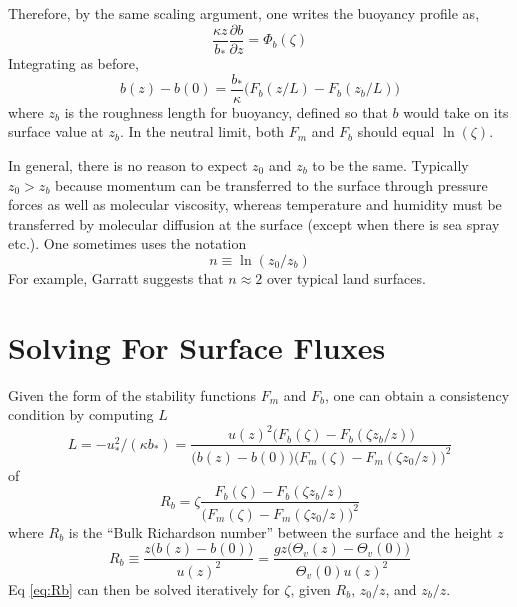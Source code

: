 \documentclass[12pt, letterpaper]{article}
\begin{document}
Therefore, by the same scaling argument, one writes the buoyancy profile as,
\begin{equation}
  \frac{\kappa z}{b_*} \frac{\partial b}{\partial z} = \Phi_b(\zeta) \label{eq:bprofile}
\end{equation}
Integrating as before,
\begin{equation}
  b(z) - b(0) = \frac{b_*}{\kappa}\big(F_b\left(z/L\right) - F_b\left(z_b/L\right)\big)
\end{equation}
where $z_b$ is the roughness length for buoyancy, defined so that $b$
would take on its surface value at $z_b$.  In the neutral limit, both
$F_m$ and $F_b$ should equal $\ln\left(\zeta\right)$.

In general, there is no reason to expect $z_0$ and $z_b$ to be the
same.  Typically $z_0 > z_b$ because momentum can be transferred to
the surface through pressure forces as well as molecular viscosity,
whereas temperature and humidity must be transferred by molecular
diffusion at the surface (except when there is sea spray etc.).  One
sometimes uses the notation
\begin{equation}
  n \equiv \ln\left(z_0/z_b\right)
\end{equation}
For example, Garratt suggests that $n \approx 2$ over typical land
surfaces.

\section{Solving For Surface Fluxes}

Given the form of the stability functions $F_m$ and $F_b$, one can
obtain a consistency condition by computing $L$
\begin{equation}
  L = -u_*^2/(\kappa b_*) = \frac{u(z)^2\big(F_b\left(\zeta\right) - F_b\left(\zeta z_b/z\right)\big)}
    {\big(b(z) - b(0)\big)\big(F_m\left(\zeta\right) - F_m\left(\zeta z_0/z\right)\big)^2}
\end{equation}
of
\begin{equation}
  R_b = \zeta \frac{F_b\left(\zeta\right) - F_b\left(\zeta z_b/z\right)}
    {\big(F_m\left(\zeta\right) - F_m\left(\zeta z_0/z\right)\big)^2} \label{eq:Rb}
\end{equation}
where $R_b$ is the ``Bulk Richardson number'' between the surface and
the height $z$
\begin{equation}
  R_b \equiv \frac{z\big(b(z) - b(0)\big)}{u(z)^2} =
    \frac{g z \big(\Theta_v(z) - \Theta_v(0)\big)}{\Theta_v(0)u(z)^2}
\end{equation}
Eq \eqref{eq:Rb} can then be solved iteratively for $\zeta$, given
$R_b$, $z_0/z$, and $z_b/z$.
\end{document}
